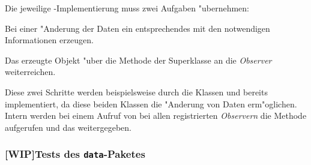 Die jeweilige -Implementierung muss zwei Aufgaben "ubernehmen:
\begin{enumerate}
	{%
	\renewcommand{\theenumi}{\arabic{enumi}}
	\renewcommand{\labelenumi}{{\theenumi}.}
	\item Bei einer "Anderung der Daten ein entsprechendes  mit den notwendigen Informationen erzeugen.
	\item Das erzeugte Objekt "uber die Methode  der Superklasse  an die \emph{Observer} weiterreichen.
	}
\end{enumerate}
Diese zwei Schritte werden beispielsweise durch die Klassen  und  bereits implementiert, da diese beiden Klassen die "Anderung von Daten erm"oglichen.
Intern werden bei einem Aufruf von  bei allen registrierten \emph{Observern} die Methode  aufgerufen und das  weitergegeben.


\subsubsection{[WIP]Tests des \texttt{data}-Paketes}

